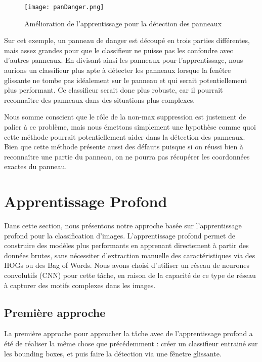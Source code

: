 \documentclass[twocolumn,10pt]{article}
\begin{document}
    \begin{figure}[H]
        \centering
        \texttt{[image: panDanger.png]}
        \caption{Amélioration de l'apprentissage pour la détection des panneaux}
        \label{fig:panDanger}
    \end{figure}

    Sur cet exemple, un panneau de danger est découpé en trois parties différentes, mais assez grandes pour que le classifieur ne puisse pas les confondre avec d'autres panneaux. En divisant ainsi les panneaux pour l'apprentissage, nous aurions un classifieur plus apte à détecter les panneaux lorsque la fenêtre glissante ne tombe pas idéalement sur le panneau et qui serait potentiellement plus performant. Ce classifieur serait donc plus robuste, car il pourrait reconnaître des panneaux dans des situations plus complexes.

    Nous somme conscient que le rôle de la non-max suppression est justement de palier à ce problème, mais nous émettons simplement une hypothèse comme quoi cette méthode pourrait potentiellement aider dans la détection des panneaux. Bien que cette méthode présente aussi des défauts puisque si on réussi bien à reconnaître une partie du panneau, on ne pourra pas récupérer les coordonnées exactes du panneau.



    \section{Apprentissage Profond}

    Dans cette section, nous présentons notre approche basée sur l'apprentissage profond pour la classification d'images. L'apprentissage profond permet de construire des modèles plus performants en apprenant directement à partir des données brutes, sans nécessiter d'extraction manuelle des caractéristiques via des HOGs ou des Bag of Words. Nous avons choisi d'utiliser un réseau de neurones convolutifs (CNN) pour cette tâche, en raison de la capacité de ce type de réseau à capturer des motifs complexes dans les images.

    \subsection{Première approche}

    La première approche pour approcher la tâche avec de l'apprentissage profond a été de réaliser la même chose que précédemment : créer un classifieur entrainé sur les bounding boxes, et puis faire la détection via une fênetre glissante.
\end{document}
